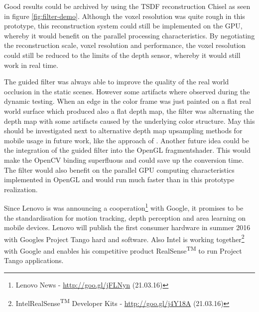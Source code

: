 \documentclass[12pt]{support/thcolognereport}
\begin{document}
Good results could be archived by using the TSDF reconstruction Chisel as seen in figure \ref{fig:filter-demo}. Although the voxel resolution was quite rough in this prototype, this reconstruction system could still be implemented on the GPU, whereby it would benefit on the parallel processing characteristics. By negotiating the reconstruction scale, voxel resolution and performance, the voxel resolution could still be reduced to the limits of the depth sensor, whereby it would still work in real time.

The guided filter was always able to improve the quality of the real world occlusion in the static scenes. However some artifacts where observed during the dynamic testing. When an edge in the color frame was just painted on a flat real world surface which produced also a flat depth map, the filter was alternating the depth map with some artifacts caused by the underlying color structure. May this should be investigated next to alternative depth map upsampling methods for mobile usage in future work, like the approach of \citep{Ferstl_2013_ICCV}. Another future idea could be the integration of the guided filter into the OpenGL fragmentshader. This would make the OpenCV binding superfluous and could save up the conversion time. The filter would also benefit on the parallel GPU computing characteristics implemented in OpenGL and would run much faster than in this prototype realization. 

Since Lenovo is was announcing a cooperation\footnote{Lenovo News - \url{http://goo.gl/jFLNyn} (21.03.16)} with Google, it promises to be the standardisation for motion tracking, depth perception and area learning on mobile devices. Lenovo will publish the first consumer hardware in summer 2016 with Googles Project Tango hard and software. Also Intel is working together\footnote{Intel\textregistered RealSense\textsuperscript{TM} Developer Kits - \url{http://goo.gl/j4Y18A} (21.03.16)} with Google and enables his competitive product RealSense\textsuperscript{TM} to run Project Tango applications.

\setlength{\parskip}{0em}



 
\end{document}

